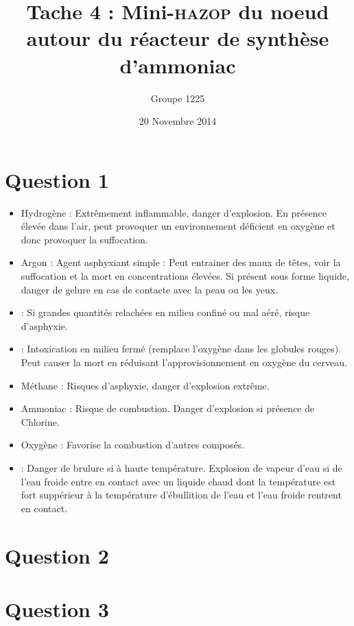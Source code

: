 \documentclass[a4paper,oneside,12pt]{article}
\title{Tache 4 : Mini-\textsc{hazop} du noeud autour du réacteur de synthèse d'ammoniac}
\author{Groupe 1225}
\date{20 Novembre 2014}
\begin{document}
\maketitle

\section*{Question 1}

\begin{itemize}
	\item{Hydrogène} : Extrêmement inflammable, danger d'explosion. 
En présence élevée dans l'air, peut provoquer un environnement déficient en oxygène et 
donc provoquer la suffocation. 

	\item{Argon} : Agent asphyxiant simple : Peut entrainer des maux de têtes, 
		voir la suffocation et la mort en concentrations élevées. 
		Si présent sous forme liquide, danger de gelure en cas de contacte 
		avec la peau ou les yeux.

	\item{} : Si grandes quantités relachées en milieu confiné ou mal aéré, 
		risque d'asphyxie.

	\item{} : Intoxication en milieu fermé (remplace l'oxygène dans les 
		globules rouges). Peut causer la mort en réduisant l'approvisionnement 
		en oxygène du cerveau.

	\item{Méthane} : Risques d'asphyxie, danger d'explosion extrême.

	\item{Ammoniac} : Risque de combustion. Danger d'explosion si présence de Chlorine.

	\item{Oxygène} : Favorise la combustion d'autres composés.

	\item{} : Danger de brulure si à haute température. 
		Explosion de vapeur d'eau si de l'eau froide entre en contact avec un 
		liquide chaud dont la température est fort suppérieur à la température 
		d'ébullition de l'eau et l'eau froide rentrent en contact.
\end{itemize}

\section*{Question 2}

\section*{Question 3}
\end{document}
